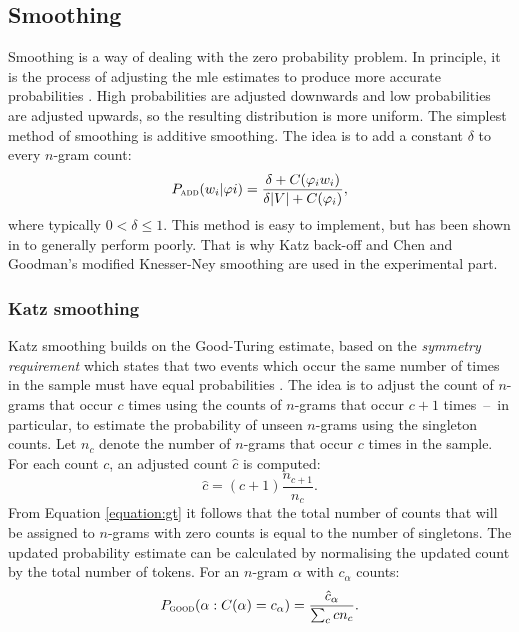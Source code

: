 	\subsection{Smoothing}
	\label{subsection:smoothing}
	Smoothing is a way of dealing with the zero probability problem. In principle, it is the process of adjusting the \gls{mle} estimates to produce more accurate probabilities \cite{chen1996empirical}. High probabilities are adjusted downwards and low probabilities are adjusted upwards, so the resulting distribution is more uniform. The simplest method of smoothing is additive smoothing. The idea is to add a constant $\delta$ to every \mbox{$n$-gram} count:
	\begin{equation}
		P_{\textsc{add}}(w_{i}|\varphi{i})=\frac{\delta+C(\varphi_{i}w_{i})}{\delta|V|+C(\varphi_{i})},
	\end{equation}
where typically $0 < \delta \leq 1$. This method is easy to implement, but has been shown in \cite{Gale94what'swrong} to generally perform poorly. That is why Katz back-off and Chen and Goodman's modified Knesser-Ney smoothing are used in the experimental part.
	\subsubsection*{Katz smoothing}
	Katz smoothing builds on the Good-Turing estimate, based on the \textit{symmetry requirement} which states that two events which occur the same number of times in the sample must have equal probabilities \cite{whittaker2000statistical}. The idea is to adjust the count of \mbox{$n$-grams} that occur $c$ times using the counts of \mbox{$n$-grams} that occur $c+1$ times~--~in particular, to estimate the probability of unseen \mbox{$n$-grams} using the singleton counts. Let $n_{c}$ denote the number of \mbox{$n$-grams} that occur $c$ times in the sample. For each count $c$, an adjusted count $\hat{c}$ is computed:
	\begin{equation}
		\hat{c}=(c+1)\frac{n_{c+1}}{n_{c}}.
		\label{equation:gt}
	\end{equation}
	From Equation \ref{equation:gt} it follows that the total number of counts that will be assigned to \mbox{$n$-grams} with zero counts is equal to the number of singletons. The updated probability estimate can be calculated by normalising the updated count by the total number of tokens. For an \mbox{$n$-gram} $\alpha$ with $c_{\alpha}$ counts:
	\begin{equation}
		P_{\textsc{good}}(\alpha:C(\alpha)=c_{\alpha})=\frac{\hat{c}_{\alpha}}{\sum_{c}cn_{c}}.
	\end{equation}

